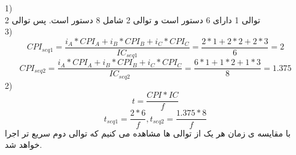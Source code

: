 1)\\
توالی 1 دارای 6 دستور است و توالی 2 شامل 8 دستور است.
پس توالی 2\\
3)\\
\begin{equation*}
    {CPI}_{seq1} = \frac{i_A*{CPI}_A + i_B*{CPI}_B + i_C*{CPI}_C}{{IC}_{seq1}} = \frac{2 * 1 + 2 * 2 + 2 * 3}{6} = 2
\end{equation*}
\begin{equation*}
    {CPI}_{seq2} = \frac{i_A*{CPI}_A + i_B*{CPI}_B + i_C*{CPI}_C}{{IC}_{seq2}} = \frac{6 * 1 + 1 * 2 + 1 * 3}{8} = 1.375
\end{equation*}
2)\\
\begin{equation*}
    t = \frac{{CPI} * {IC}}{f}
\end{equation*}
\begin{equation*}
    t_{seq1} = \frac{2 * 6}{f}, t_{seq2} = \frac{1.375 * 8}{f} 
\end{equation*}
با مقایسه ی زمان هر یک از توالی ها مشاهده می کنیم که توالی دوم سریع تر اجرا خواهد شد.